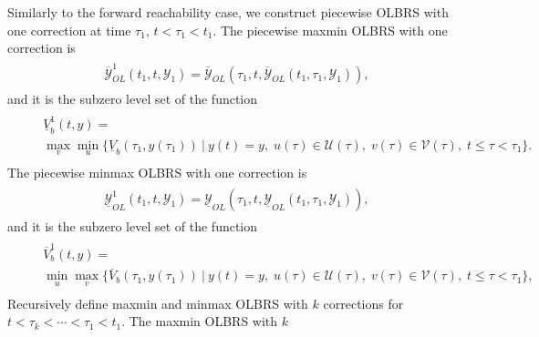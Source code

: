 \documentclass[letterpaper,10pt,english]{sphinxmanual}
\begin{document}
Similarly to the forward reachability case, we construct piecewise OLBRS
with one correction at time $\tau_1$, $t<\tau_1<t_1$. The
piecewise maxmin OLBRS with one correction is
\label{chap_reach:equation-maxminb1}\begin{gather}
\begin{split}\overline{{\mathcal Y}}_{OL}^1(t_1, t, {\mathcal Y}_1) = \overline{{\mathcal Y}}_{OL}(\tau_1, t, \overline{{\mathcal Y}}_{OL}(t_1, \tau_1, {\mathcal Y}_1)),\end{split}\label{chap_reach-maxminb1}
\end{gather}
and it is the subzero level set of the function
\label{chap_reach:equation-maxminvfb1}\begin{gather}
\begin{split}\begin{aligned}
&&\underline{V}^1_b(t, y) = \nonumber \\
&&\max_v\min_u\{\underline{V}_b(\tau_1, y(\tau_1)) ~|~
y(t)=y, \; u(\tau)\in{\mathcal U}(\tau), \;
v(\tau)\in{\mathcal V}(\tau), \; t\leqslant\tau<\tau_1\}.
\end{aligned}\end{split}\label{chap_reach-maxminvfb1}
\end{gather}
The piecewise minmax OLBRS with one correction is
\label{chap_reach:equation-minmaxb1}\begin{gather}
\begin{split}\underline{{\mathcal Y}}_{OL}^1(t_1, t, {\mathcal Y}_1) = \underline{{\mathcal Y}}_{OL}(\tau_1, t, \underline{{\mathcal Y}}_{OL}(t_1, \tau_1, {\mathcal Y}_1)),\end{split}\label{chap_reach-minmaxb1}
\end{gather}
and it is the subzero level set of the function
\label{chap_reach:equation-minmaxvfb1}\begin{gather}
\begin{split}\begin{aligned}
&&\overline{V}^1_b(t, y) = \nonumber \\
&&\min_u\max_v\{\overline{V}_b(\tau_1, y(\tau_1)) ~|~
y(t)=y, \; u(\tau)\in{\mathcal U}(\tau), \;
v(\tau)\in{\mathcal V}(\tau), \; t\leqslant\tau<\tau_1\},
\end{aligned}\end{split}\label{chap_reach-minmaxvfb1}
\end{gather}
Recursively define maxmin and minmax OLBRS with $k$ corrections
for $t<\tau_k<\cdots<\tau_1<t_1$. The maxmin OLBRS with $k$
\end{document}
